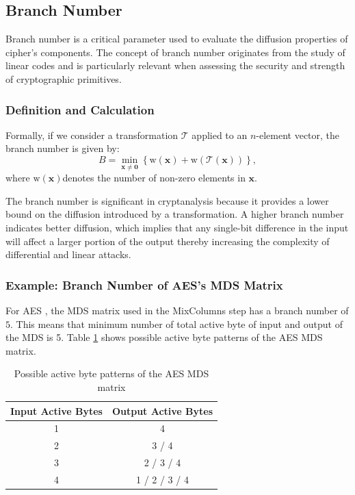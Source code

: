 \subsection{Branch Number} \label{sec:branch}
Branch number is a critical parameter used to evaluate the diffusion properties of cipher's components. The concept of branch number originates from the study of linear codes and is particularly relevant when assessing the security and strength of cryptographic primitives.

\subsubsection{Definition and Calculation}

Formally, if we consider a transformation $\mathcal{T}$ applied to an $n$-element vector, the branch number is given by:
$$
B = \min_{\mathbf{x} \neq \mathbf{0}} \left\{ \text{w}(\mathbf{x}) + \text{w}(\mathcal{T}(\mathbf{x})) \right\},
$$
where $\text{w}(\mathbf{x})$denotes the number of non-zero elements in $\mathbf{x}$.

The branch number is significant in cryptanalysis because it provides a lower bound on the diffusion introduced by a transformation. A higher branch number indicates better diffusion, which implies that any single-bit difference in the input will affect a larger portion of the output thereby increasing the complexity of differential and linear attacks.

\subsubsection{Example: Branch Number of AES's MDS Matrix}


For AES \cite{dworkin2001advanced}, the MDS matrix used in the MixColumns step has a branch number of $5$. This means that minimum number of total active byte of input and output of the MDS is 5. Table \ref{tab:aes-mds} shows possible active byte patterns of the AES MDS matrix.

\begin{table}[h]
\centering
\caption{Possible active byte patterns of the AES MDS matrix}
\begin{tabular}{|c|c|}
\hhline{|=|=|}
\textbf{Input Active Bytes} & \textbf{Output Active Bytes}           \\ \hline
1                           & 4                                      \\ \hline
2                           & 3 / 4                                   \\ \hline
3                           & 2 / 3 / 4                               \\ \hline
4                           & 1 / 2 / 3 / 4                           \\ \hline
\end{tabular}

\label{tab:aes-mds}
\end{table}


